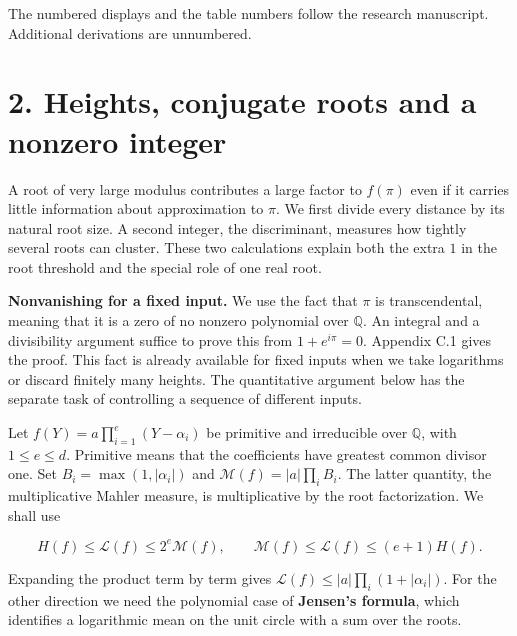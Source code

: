 \documentclass[11pt,a4paper]{article}
\begin{document}
The numbered displays and the table numbers follow the research manuscript. Additional derivations are unnumbered.

\section{2. Heights, conjugate roots and a nonzero integer}\label{heights-conjugate-roots-and-a-nonzero-integer}

A root of very large modulus contributes a large factor to \(f(\pi)\) even if it carries little information about approximation to \(\pi\). We first divide every distance by its natural root size. A second integer, the discriminant, measures how tightly several roots can cluster. These two calculations explain both the extra \(1\) in the root threshold and the special role of one real root.

\textbf{Nonvanishing for a fixed input.} We use the fact that \(\pi\) is transcendental, meaning that it is a zero of no nonzero polynomial over \(\mathbb Q\). An integral and a divisibility argument suffice to prove this from \(1+e^{i\pi}=0\). Appendix C.1 gives the proof. This fact is already available for fixed inputs when we take logarithms or discard finitely many heights. The quantitative argument below has the separate task of controlling a sequence of different inputs.

Let \(f(Y)=a\prod_{i=1}^{e}(Y-\alpha_i)\) be primitive and irreducible over \(\mathbb Q\), with \(1\le e\le d\). Primitive means that the coefficients have greatest common divisor one. Set \(B_i=\max(1,|\alpha_i|)\) and \(\mathcal M(f)=|a|\prod_i B_i\). The latter quantity, the multiplicative Mahler measure, is multiplicative by the root factorization. We shall use

\[
 H(f)\le \mathcal L(f)\le 2^e\mathcal M(f),\qquad
 \mathcal M(f)\le\mathcal L(f)\le(e+1)H(f).                             \tag{3}\label{eq:3}
\]

Expanding the product term by term gives \(\mathcal L(f)\le |a|\prod_i(1+|\alpha_i|)\). For the other direction we need the polynomial case of \textbf{Jensen's formula}, which identifies a logarithmic mean on the unit circle with a sum over the roots.
\end{document}

